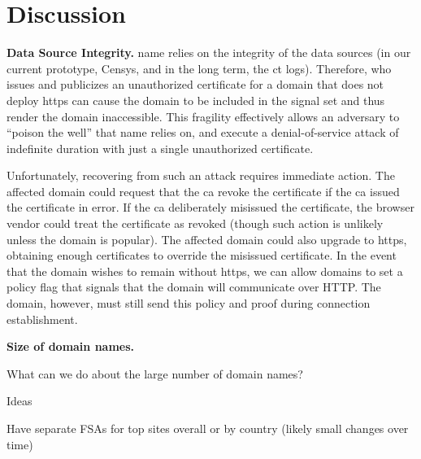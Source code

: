 \section{Discussion}
\label{sec:discussion}

\textbf{Data Source Integrity.} \ac{name} relies on the integrity of the data
sources (in our current prototype, Censys, and in the long term, the \ac{ct}
logs). Therefore,  who issues and publicizes an unauthorized certificate
for a domain that does not deploy \ac{https} can cause the domain to be included
in the signal set and thus render the domain inaccessible. This fragility
effectively allows an adversary to ``poison the well'' that \ac{name} relies on,
and execute a denial-of-service attack of indefinite duration with just a single
unauthorized certificate.

Unfortunately, recovering from such an attack requires immediate action. The
affected domain could request that the \ac{ca} revoke the certificate if the
\ac{ca} issued the certificate in error. If the \ac{ca} deliberately misissued
the certificate, the browser vendor could treat the certificate as revoked
(though such action is unlikely unless the domain is popular). The affected
domain could also upgrade to \ac{https}, obtaining enough certificates to
override the misissued certificate. In the event that the domain wishes to
remain without \ac{https}, we can allow domains to set a policy flag that
signals that the domain will communicate over HTTP. The domain, however, must
still send this policy and proof during connection establishment.

\textbf{Size of domain names.}
\begin{compactitem}
\item What can we do about the large number of domain names?
\item Ideas
  \begin{compactitem}
  \item Have separate FSAs for top sites overall or by country (likely small
    changes over time)
  \end{compactitem}
\end{compactitem}
